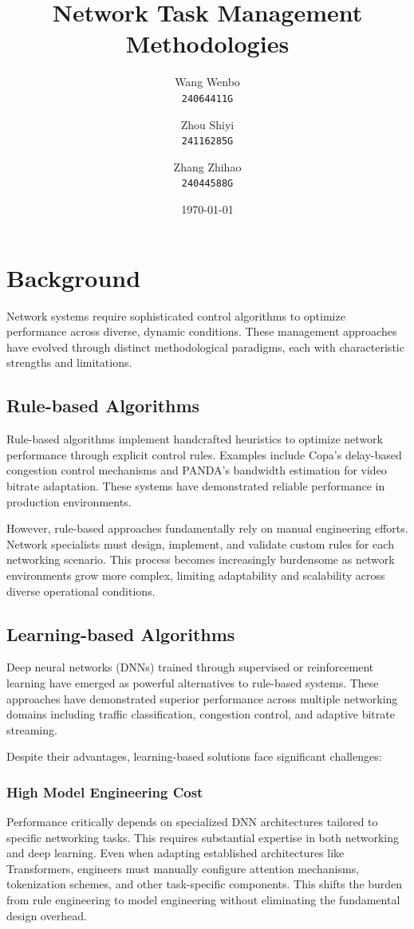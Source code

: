 \documentclass[twocolumn]{article}
\title{Network Task Management Methodologies}
\author{Wang Wenbo \\ \texttt{24064411G} \and Zhou Shiyi \\ \texttt{24116285G} \and Zhang Zhihao \\ \texttt{24044588G}}
\date{\today}
\begin{document}

\maketitle

\section{Background}
Network systems require sophisticated control algorithms to optimize performance across diverse, dynamic conditions. These management approaches have evolved through distinct methodological paradigms, each with characteristic strengths and limitations.

\subsection{Rule-based Algorithms}
Rule-based algorithms implement handcrafted heuristics to optimize network performance through explicit control rules. Examples include Copa's delay-based congestion control mechanisms and PANDA's bandwidth estimation for video bitrate adaptation. These systems have demonstrated reliable performance in production environments.

However, rule-based approaches fundamentally rely on manual engineering efforts. Network specialists must design, implement, and validate custom rules for each networking scenario. This process becomes increasingly burdensome as network environments grow more complex, limiting adaptability and scalability across diverse operational conditions.

\subsection{Learning-based Algorithms}
Deep neural networks (DNNs) trained through supervised or reinforcement learning have emerged as powerful alternatives to rule-based systems. These approaches have demonstrated superior performance across multiple networking domains including traffic classification, congestion control, and adaptive bitrate streaming.

Despite their advantages, learning-based solutions face significant challenges:

\subsubsection{High Model Engineering Cost}
Performance critically depends on specialized DNN architectures tailored to specific networking tasks. This requires substantial expertise in both networking and deep learning. Even when adapting established architectures like Transformers, engineers must manually configure attention mechanisms, tokenization schemes, and other task-specific components. This shifts the burden from rule engineering to model engineering without eliminating the fundamental design overhead.
\end{document}

